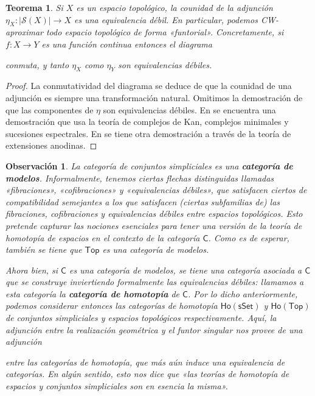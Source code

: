 \documentclass[11pt]{report}
\theoremstyle{colored}
\newtheorem{theorem}{Teorema}[section]
\newtheorem{remark}{Observación}[section]
\newcommand{\cat}[1]{\mathsf{#1}}
\newcommand{\guill}[1]{«#1»}
\begin{document}
\begin{theorem} Si $X$ es un espacio topológico, la counidad de la adjunción $\eta_X : |\mathcal{S}(X)|\to X$ es una equivalencia débil. En particular, podemos CW-aproximar todo espacio topológico de forma \guill{funtorial}. Concretamente, si $f : X \to Y$ es una función continua entonces el diagrama
\begin{center}
\end{center}
conmuta, y tanto $\eta_X$ como $\eta_Y$ son equivalencias débiles.
\end{theorem}
\begin{proof} La conmutatividad del diagrama se deduce de que la counidad de una adjunción es siempre una transformación natural. Omitimos la demostración de que las componentes de $\eta$ son equivalencias débiles. En \cite{M} se encuentra una demostración que usa la teoría de complejos de Kan, complejos minimales y sucesiones espectrales. En \cite{GJ} se tiene otra demostración a través de la teoría de extensiones anodinas. 
\end{proof}

\begin{remark} La categoría de conjuntos simpliciales es una \textbf{categoría de modelos}. Informalmente, tenemos ciertas flechas distinguidas llamadas \guill{fibraciones}, \guill{cofibraciones} y \guill{equivalencias débiles}, que satisfacen ciertos de compatibilidad semejantes a los que satisfacen (ciertas subfamilias de) las fibraciones, cofibraciones y equivalencias débiles entre espacios topológicos. Esto pretende capturar las nociones esenciales para tener una versión de la teoría de homotopía de espacios en el contexto de la categoría $\cat{C}$. Como es de esperar, también se tiene que $\cat{Top}$ es una categoría de modelos.

Ahora bien, si $\cat{C}$ es una categoría de modelos, se tiene una categoría asociada a $\cat{C}$ que se construye inviertiendo formalmente las equivalencias débiles: llamamos a esta categoría la \textbf{categoría de homotopía} de $\cat{C}$. Por lo dicho anteriormente, podemos considerar entonces las categorías de homotopía $\cat{Ho(sSet)}$ y $\cat{Ho(Top)}$ de conjuntos simpliciales y espacios topológicos respectivamente. Aquí, la adjunción entre la realización geométrica y el funtor singular nos provee de una adjunción
\begin{center}
\end{center}
entre las categorías de homotopía, que más aún induce una equivalencia de categorías. En algún sentido, esto nos dice que \guill{las teorías de homotopía de espacios y conjuntos simpliciales son en esencia la misma}. 

\end{remark}
\end{document}
